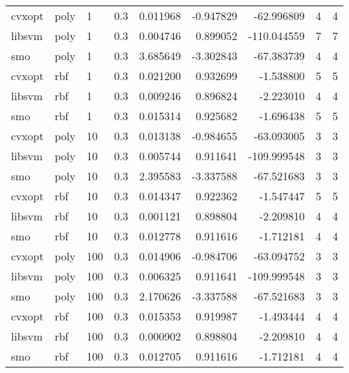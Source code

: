 \begin{tabular}{llllrrrrr}
cvxopt &   poly &   1 &     0.3 &    0.011968 & -0.947829 &  -62.996809 &            4 &          4 \\
libsvm &   poly &   1 &     0.3 &    0.004746 &  0.899052 & -110.044559 &            7 &          7 \\
   smo &   poly &   1 &     0.3 &    3.685649 & -3.302843 &  -67.383739 &            4 &          4 \\
cvxopt &    rbf &   1 &     0.3 &    0.021200 &  0.932699 &   -1.538800 &            5 &          5 \\
libsvm &    rbf &   1 &     0.3 &    0.009246 &  0.896824 &   -2.223010 &            4 &          4 \\
   smo &    rbf &   1 &     0.3 &    0.015314 &  0.925682 &   -1.696438 &            5 &          5 \\
cvxopt &   poly &  10 &     0.3 &    0.013138 & -0.984655 &  -63.093005 &            3 &          3 \\
libsvm &   poly &  10 &     0.3 &    0.005744 &  0.911641 & -109.999548 &            3 &          3 \\
   smo &   poly &  10 &     0.3 &    2.395583 & -3.337588 &  -67.521683 &            3 &          3 \\
cvxopt &    rbf &  10 &     0.3 &    0.014347 &  0.922362 &   -1.547447 &            5 &          5 \\
libsvm &    rbf &  10 &     0.3 &    0.001121 &  0.898804 &   -2.209810 &            4 &          4 \\
   smo &    rbf &  10 &     0.3 &    0.012778 &  0.911616 &   -1.712181 &            4 &          4 \\
cvxopt &   poly & 100 &     0.3 &    0.014906 & -0.984706 &  -63.094752 &            3 &          3 \\
libsvm &   poly & 100 &     0.3 &    0.006325 &  0.911641 & -109.999548 &            3 &          3 \\
   smo &   poly & 100 &     0.3 &    2.170626 & -3.337588 &  -67.521683 &            3 &          3 \\
cvxopt &    rbf & 100 &     0.3 &    0.015353 &  0.919987 &   -1.493444 &            4 &          4 \\
libsvm &    rbf & 100 &     0.3 &    0.000902 &  0.898804 &   -2.209810 &            4 &          4 \\
   smo &    rbf & 100 &     0.3 &    0.012705 &  0.911616 &   -1.712181 &            4 &          4 \\
\bottomrule
\end{tabular}
